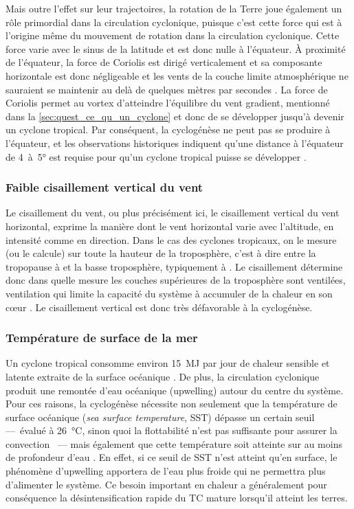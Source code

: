 \documentclass[../main.tex]{subfiles}
\begin{document}
Mais outre l'effet sur leur trajectoires, la rotation de la Terre joue également un rôle primordial dans la circulation cyclonique, puisque c'est cette force qui
est à l'origine même du mouvement de rotation dans la circulation cyclonique. Cette force varie avec le sinus de la latitude et est donc nulle à l'équateur. À
proximité de l'équateur, la force de Coriolis est dirigé verticalement  et sa composante horizontale est donc négligeable et les vents de la couche limite atmosphérique ne sauraient se maintenir au delà de quelques
mètres par secondes \parencite{gray_tropical_1975}. La force de Coriolis permet au vortex d'atteindre l'équilibre du vent gradient, mentionné dans la
\cref{sec:quest_ce_qu_un_cyclone} et donc de se développer jusqu'à devenir un cyclone tropical. Par conséquent, la cyclogénèse ne peut pas se produire à
l'équateur, et les observations historiques indiquent qu'une distance à l'équateur de \num{4}~à~\ang{5} est requise pour qu'un cyclone tropical puisse se
développer \parencite{gray_global_1968}.

\subsubsection*{Faible cisaillement vertical du vent}

Le cisaillement du vent, ou plus précisément ici, le cisaillement vertical du vent horizontal, exprime la manière dont le vent horizontal varie avec l'altitude,
en intensité comme en direction. Dans le cas des cyclones tropicaux, on le mesure (ou le calcule) sur toute la hauteur de la troposphère, c'est à dire entre la
tropopause à  et la basse troposphère, typiquement à . Le cisaillement détermine donc dans quelle mesure les couches supérieures de la
troposphère sont ventilées, ventilation qui limite la capacité du système à accumuler de la chaleur en son cœur \parencite{gray_tropical_1975}. Le
cisaillement vertical est donc très défavorable à la cyclogénèse.

\subsubsection*{Température de surface de la mer}

Un cyclone tropical consomme environ \SI{15}{\mega\joule} par jour de chaleur sensible et latente extraite de la surface océanique
\parencite{gray_tropical_1975}. De plus, la circulation cyclonique produit une remontée d'eau océanique (upwelling) autour du centre du système. Pour ces
raisons, la cyclogénèse nécessite non seulement que la température de surface océanique (\textit{sea surface temperature}, SST) dépasse un certain seuil
---~évalué à \SI{26}{\degreeCelsius}, sinon quoi la flottabilité n'est pas suffisante pour assurer la convection \parencite{palmen_formation_1948}~--- mais
également que cette température soit atteinte sur au moins  de profondeur d'eau \parencite{leipper_observed_1967,perlboth_hurricane_1967}. En effet, si ce
seuil de SST n'est atteint qu'en surface, le phénomène d'upwelling apportera de l'eau plus froide qui ne permettra plus d'alimenter le système. Ce besoin
important en chaleur a généralement pour conséquence la désintensification rapide du TC mature lorsqu'il atteint les terres.
\end{document}
